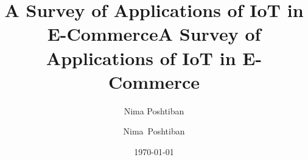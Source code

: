 \documentclass[10pt,journal,compsoc]{IEEEtran}
\author{\fontfamily{calligra}\selectfont Nima Poshtiban}
\date{\today}
\title{\textbf{A Survey of Applications of IoT in E-Commerce}}
\begin{document}
		\title{A Survey of Applications of IoT in E-Commerce}

		\author{Nima~Poshtiban}


\end{document}
